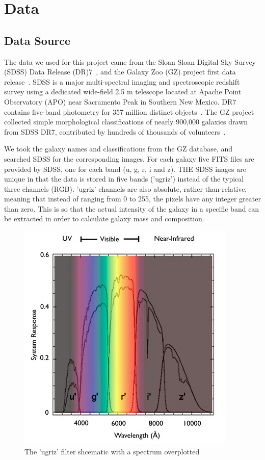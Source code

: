 \section{Data}
\label{sec:data}
\subsection{Data Source}
The data we used for this project came from the Sloan Sloan Digital Sky Survey (SDSS) Data Release (DR)7~\cite{abazajian2009seventh}, and the Galaxy Zoo (GZ) project first data release~\cite{lintott2010galaxy}. 
SDSS is a major multi-spectral imaging and spectroscopic redshift survey using a dedicated wide-field 2.5 m telescope located at Apache Point Observatory (APO) near Sacramento Peak in Southern New Mexico.
DR7 contains five-band photometry for 357 million distinct objects~\cite{abazajian2009seventh}. 
The GZ project collected simple morphological classifications of nearly 900,000 galaxies drawn from SDSS DR7, contributed by hundreds of thousands of volunteers~\cite{lintott2010galaxy}. 

We took the galaxy names and classifications from the GZ database, and searched SDSS for the corresponding images. For each galaxy five FITS files are provided by SDSS, one for each band (u, g, r, i and z). 
THE SDSS inages are unique in that the data is stored in five bands ('ugriz') instead of the typical three channels (RGB). 
'ugriz' channels are also absolute, rather than relative, meaning that instead of ranging from 0 to 255, the pixels have any integer greater than zero. 
This is so that the actual intensity of the galaxy in a specific band can be extracted in order to calculate galaxy mass and composition.


\begin{figure}[h!]
	\centering
	\captionsetup{justification=centering}
	\includegraphics[scale=0.5]{Figures/filters.jpg}
	\caption{The 'ugriz' filter shcematic with a spectrum overplotted}
	\label{fig:filters}
\end{figure}



